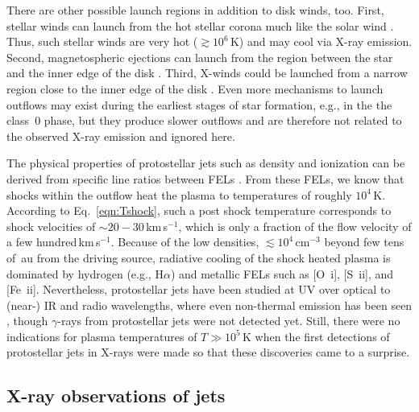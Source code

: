 \documentclass[graybox, nosecnum]{svmult}
\begin{document}
There are other possible launch regions in addition to disk winds, too. First, stellar winds can launch from the hot stellar corona much like the solar wind \citep{Matt_2005}. Thus, such stellar winds are very hot ($\gtrsim10^6$\,K) and may cool via X-ray emission. Second, magnetospheric ejections can launch from the region between the star and the inner edge of the disk \citep{Zanni_2013}. Third, X-winds could be launched from a narrow region close to the inner edge of the disk \citep{Shu_1994}. Even more mechanisms to launch outflows may exist  during the earliest stages of star formation, e.g., in the the class~0 phase, but they produce slower outflows and are therefore not related to the observed X-ray emission and ignored here.

The physical properties of protostellar jets such as density and ionization can be derived from specific line ratios between FELs  \cite{Bacciotti_1999}. From these FELs, we know that shocks within the outflow heat the plasma to temperatures of roughly $10^4\,$K. According to Eq.~\ref{eqn:Tshock}, such a post shock temperature corresponds to shock velocities of $\sim20-30$\,km\,s$^{-1}$, which is only a fraction of the flow velocity of a few hundred\,km\,s$^{-1}$.
%
Because of the low densities, $\lesssim10^4\,$cm$^{-3}$ beyond few tens of~au from the driving source, radiative cooling of the shock heated plasma is dominated by hydrogen (e.g., H$\alpha$) and metallic FELs such as [O~{\sc i}], [S~{\sc ii}], and [Fe~{\sc ii}].
Nevertheless, protostellar jets have been studied at UV over optical to (near-) IR and radio wavelengths, where even non-thermal emission has been seen \cite{Ainsworth_2014,Rodriguez_2017}, though $\gamma$-rays from protostellar jets were not detected yet.
Still, there were no indications for plasma temperatures of $T\gg10^5\,$K when the first detections of protostellar jets in X-rays were made so that these discoveries came to a surprise.



\subsection{X-ray observations of jets}
\end{document}
